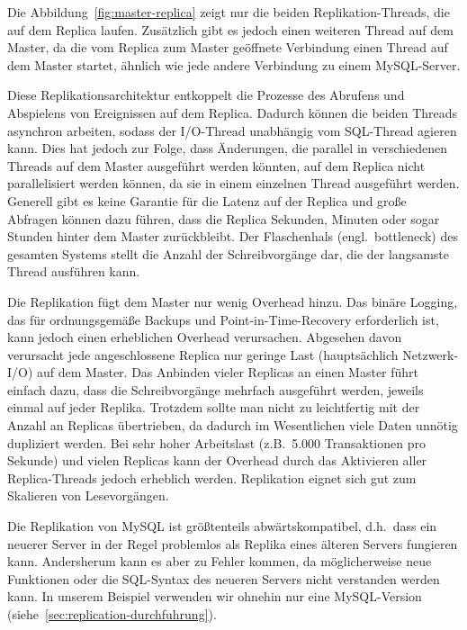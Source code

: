 Die Abbildung~\ref{fig:master-replica} zeigt nur die beiden Replikation-Threads, die auf dem Replica laufen.
Zusätzlich gibt es jedoch einen weiteren Thread auf dem Master, da die vom Replica zum Master geöffnete Verbindung einen Thread auf dem Master startet, ähnlich wie jede andere Verbindung zu einem MySQL-Server.

Diese Replikationsarchitektur entkoppelt die Prozesse des Abrufens und Abspielens von Ereignissen auf dem Replica.
Dadurch können die beiden Threads asynchron arbeiten, sodass der I/O-Thread unabhängig vom SQL-Thread agieren kann.
Dies hat jedoch zur Folge, dass Änderungen, die parallel in verschiedenen Threads auf dem Master ausgeführt werden könnten, auf dem Replica nicht parallelisiert werden können, da sie in einem einzelnen Thread ausgeführt werden.
Generell gibt es keine Garantie für die Latenz auf der Replica und große Abfragen können dazu führen, dass die Replica Sekunden, Minuten oder sogar Stunden hinter dem Master zurückbleibt.
Der Flaschenhals (engl.\ bottleneck) des gesamten Systems stellt die Anzahl der Schreibvorgänge dar, die der langsamste Thread ausführen kann.

Die Replikation fügt dem Master nur wenig Overhead hinzu.
Das binäre Logging, das für ordnungsgemäße Backups und Point-in-Time-Recovery erforderlich ist, kann jedoch einen erheblichen Overhead verursachen.
Abgesehen davon verursacht jede angeschlossene Replica nur geringe Last (hauptsächlich Netzwerk-I/O) auf dem Master.
Das Anbinden vieler Replicas an einen Master führt einfach dazu, dass die Schreibvorgänge mehrfach ausgeführt werden, jeweils einmal auf jeder Replika.
Trotzdem sollte man nicht zu leichtfertig mit der Anzahl an Replicas übertrieben, da dadurch im Wesentlichen viele Daten unnötig dupliziert werden.
Bei sehr hoher Arbeitslast (z.B.\ 5.000 Transaktionen pro Sekunde) und vielen Replicas kann der Overhead durch das Aktivieren aller Replica-Threads jedoch erheblich werden.
Replikation eignet sich gut zum Skalieren von Lesevorgängen.

Die Replikation von MySQL ist größtenteils abwärtskompatibel, d.h.\ dass ein neuerer Server in der Regel problemlos als Replika eines älteren Servers fungieren kann.
Andersherum kann es aber zu Fehler kommen, da möglicherweise neue Funktionen oder die SQL-Syntax des neueren Servers nicht verstanden werden kann.
In unserem Beispiel verwenden wir ohnehin nur eine MySQL-Version (siehe~\ref{sec:replication-durchfuhrung}).

